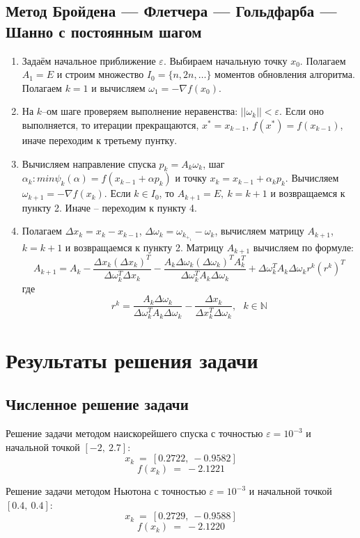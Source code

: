 \documentclass{article}
\begin{document}
\subsection{Метод Бройдена — Флетчера — Гольдфарба — Шанно с постоянным шагом}
\begin{enumerate}
    \item Задаём начальное приближение $\varepsilon$. Выбираем начальную точку $x_0$. Полагаем $A_1=E$ и строим множество $I_0=\{n,2n,\dots\}$ моментов обновления алгоритма. Полагаем $k=1$ и вычисляем $\omega_1=-\nabla f(x_0)$.
    \item На $k$--ом шаге проверяем выполнение неравенства: $||\omega_k||<\varepsilon$. Если оно выполняется, то итерации прекращаются, $x^{*}=x_{k-1},~f(x^{*})=f(x_{k-1})$, иначе переходим к третьему пунтку.
    \item Вычисляем направление спуска $p_k=A_k \omega_k$, шаг $\alpha_k: min \psi_k(\alpha)=f(x_{k-1}+\alpha p_k)$ и точку $x_k=x_{k-1}+\alpha_k p_k$. Вычисляем $\omega_{k+1}=-\nabla f(x_k)$. Если $k \in I_0$, то $A_{k+1}=E,~k=k+1$ и возвращаемся к пункту 2. Иначе -- переходим к пункту 4.
    \item Полагаем $\Delta x_k=x_k-x_{k-1}$, $\Delta \omega_k=\omega_k_+_1-\omega_k$, вычисляем матрицу $A_{k+1}$, $k=k+1$ и возвращаемся к пункту 2.
    Матрицу $A_{k+1}$ вычисляем по формуле:
    $$A_{k+1}=A_k-\frac{\Delta x_k(\Delta x_k)^T}{\Delta \omega_k^T \Delta x_k}-\frac{A_k \Delta \omega_k (\Delta \omega_k)^T A_k^T}{\Delta \omega_k^T A_k \Delta \omega_k}+\Delta \omega_k^T A_k \Delta \omega_k r^k (r^k)^T$$
    где $$r^k=\frac{A_k \Delta \omega_k}{ \Delta \omega_k^T A_k \Delta \omega_k}-\frac{\Delta x_k}{\Delta x_k^T \Delta \omega_k},~~~k \in \mathbb{N}$$
\end{enumerate}

\section{Результаты решения задачи}
\subsection{Численное решение задачи}
\noindent Решение задачи методом наискорейшего спуска с точностью $\varepsilon = 10^{-3}$ и начальной точкой $[-2,~2.7]$: 
$$x_k~=~[0.2722,~-0.9582]$$
$$f(x_k)~=~-2.1221$$

\noindent Решение задачи методом Ньютона с точностью $\varepsilon = 10^{-3}$ и начальной точкой $[0.4,~0.4]$: 
$$x_k~=~[0.2729,~-0.9588]$$
$$f(x_k)~=~-2.1220$$
\end{document}
